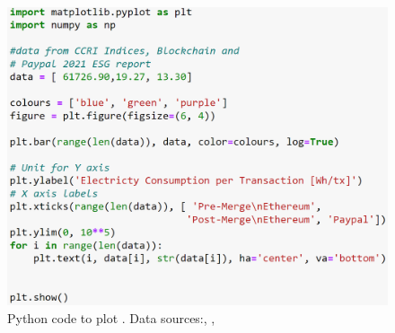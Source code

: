 \begin{figure}[!htb]
    \includegraphics[width=13cm,center]{Figures/PaypalEthElectrcityPlotCode.png}
    \caption*{Python code to plot . Data sources:\cite{CCRIIndices}, \cite{EthereumBlockchair},\cite{2007IntroductionPayPal}}
    \label{Figure:PaypalEthElectrciityPlotCode}
\end{figure}